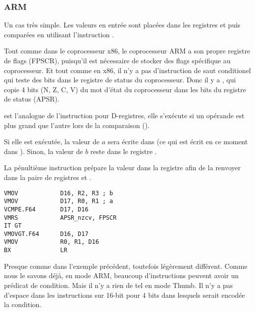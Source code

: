 \subsubsection{ARM}

\myparagraph{\OptimizingXcodeIV (\ARMMode)}



Un cas très simple.
Les valeurs en entrée sont placées dans les registres  et  puis
comparées en utilisant l'instruction .

Tout comme dans le coprocesseur x86, le coprocesseur ARM a son propre registre de
flags (\ac{FPSCR}), puisqu'il est nécessaire de stocker des flags spécifique au coprocesseur.
Et tout comme en x86, il n'y a pas d'instruction de saut conditionel qui teste des
bits dans le registre de status du coprocesseur.
Donc il y a , qui copie 4 bits (N, Z, C, V) du mot d'état du coprocesseur
dans les bits du registre de status  (\ac{APSR}).

 est l'analogue de l'instruction  pour D-registres, elle s'exécute
si un opérande est plus grand que l'autre lors de la comparaison ().

Si elle est exécutée, la valeur de $a$ sera écrite dans  (ce qui est écrit
en ce moment dans ).
Sinon, la valeur de $b$ reste dans le registre .


La pénultième instruction  prépare la valeur dans la registre 
afin de la renvoyer dans la paire de registres  et .

\myparagraph{\OptimizingXcodeIV (\ThumbTwoMode)}

\begin{lstlisting}[caption=\OptimizingXcodeIV (\ThumbTwoMode),style=customasmARM]
VMOV            D16, R2, R3 ; b
VMOV            D17, R0, R1 ; a
VCMPE.F64       D17, D16
VMRS            APSR_nzcv, FPSCR
IT GT 
VMOVGT.F64      D16, D17
VMOV            R0, R1, D16
BX              LR
\end{lstlisting}

Presque comme dans l'exemple précédent, toutefois légèrement différent.
Comme nous le savons déjà, en mode ARM, beaucoup d'instructions peuvent avoir un
prédicat de condition.
Mais il n'y a rien de tel en mode Thumb.
Il n'y a pas d'espace dans les instructions sur 16-bit pour 4 bits dans lesquels
serait encodée la condition.

